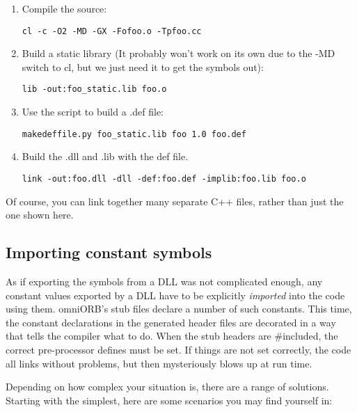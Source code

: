 \documentclass[11pt,oneside,a4paper]{book}
\newcommand{\cmdline}[1]{\texttt{#1}}
\begin{document}
\begin{enumerate}
\item Compile the source:

  \cmdline{cl -c -O2 -MD -GX -Fofoo.o -Tpfoo.cc}

\item Build a static library (It probably won't work on its own due to
      the -MD switch to cl, but we just need it to get the symbols
      out):

  \cmdline{lib -out:foo\_static.lib foo.o}

\item Use the script to build a .def file:

  \cmdline{makedeffile.py foo\_static.lib foo 1.0 foo.def}

\item Build the .dll and .lib with the def file.

  \cmdline{link -out:foo.dll -dll -def:foo.def -implib:foo.lib foo.o}
\end{enumerate}

Of course, you can link together many separate C++ files, rather than
just the one shown here.


\subsection{Importing constant symbols}

As if exporting the symbols from a DLL was not complicated enough, any
constant values exported by a DLL have to be explicitly
\emph{imported} into the code using them. omniORB's stub files declare
a number of such constants. This time, the constant declarations in
the generated header files are decorated in a way that tells the
compiler what to do. When the stub headers are \#included, the correct
pre-processor defines must be set. If things are not set correctly,
the code all links without problems, but then mysteriously blows up at
run time.

Depending on how complex your situation is, there are a range of
solutions. Starting with the simplest, here are some scenarios you may
find yourself in:
\end{document}
